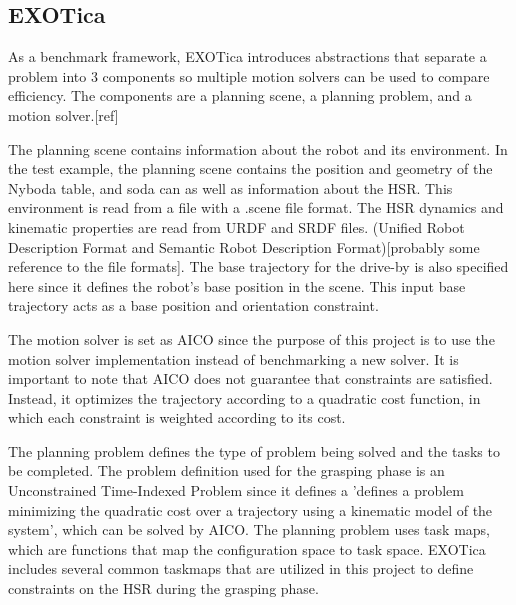 \documentclass[12pt]{article}
\begin{document}
        \subsection{EXOTica}
            As a benchmark framework, EXOTica introduces abstractions that separate a problem into 3 components so multiple motion solvers can be used to compare efficiency.\cite{koubaa_exotica_2019} The components are a planning scene, a planning problem, and a motion solver.[ref]
                
            \par The planning scene contains information about the robot and its environment. In the test example, the planning scene contains the position and geometry of the Nyboda table, and soda can as well as information about the HSR. This environment is read from a file with a .scene file format. The HSR dynamics and kinematic properties are read from URDF and SRDF files. (Unified Robot Description Format and Semantic Robot Description Format)[probably some reference to the file formats]. The base trajectory for the drive-by is also specified here since it defines the robot's base position in the scene. This input base trajectory acts as a base position and orientation constraint.

            \par The motion solver is set as AICO since the purpose of this project is to use the motion solver implementation instead of benchmarking a new solver. It is important to note that AICO does not guarantee that constraints are satisfied. Instead, it optimizes the trajectory according to a quadratic cost function, in which each constraint is weighted according to its cost.

            \par The planning problem defines the type of problem being solved and the tasks to be completed. The problem definition used for the grasping phase is an Unconstrained Time-Indexed Problem since it defines a 'defines a problem minimizing the quadratic cost over a trajectory using a kinematic model of the system', which can be solved by AICO. The planning problem uses task maps, which are functions that map the configuration space to task space. EXOTica includes several common taskmaps that are utilized in this project to define constraints on the HSR during the grasping phase.
            
\end{document}
